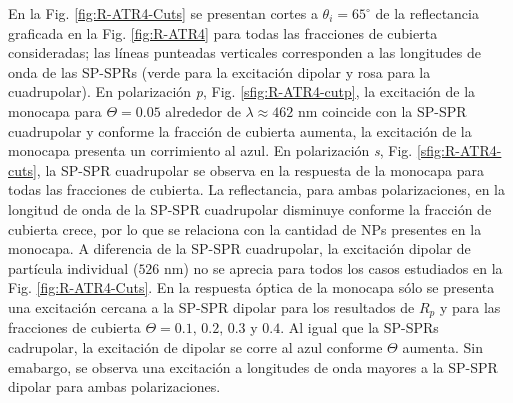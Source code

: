   En la Fig. \ref{fig:R-ATR4-Cuts} se presentan cortes a $\theta_i = 65^\circ$ de la reflectancia graficada en la Fig. \ref{fig:R-ATR4} para todas las fracciones de cubierta consideradas; las líneas punteadas verticales corresponden a las longitudes de onda de las SP-SPRs (verde para la excitación dipolar y rosa para la cuadrupolar). En polarización \emph{p}, Fig. \ref{sfig:R-ATR4-cutp}, la excitación de la monocapa para $\Theta=0.05$ alrededor de $\lambda \approx 462$ nm coincide con la SP-SPR cuadrupolar y conforme la fracción de cubierta aumenta, la excitación de la monocapa presenta un corrimiento al azul. En polarización \emph{s}, Fig. \ref{sfig:R-ATR4-cuts},  la SP-SPR cuadrupolar se observa en la respuesta de la monocapa para todas las fracciones de cubierta. La reflectancia, para ambas polarizaciones, en la longitud de onda de la SP-SPR cuadrupolar disminuye conforme la fracción de cubierta crece, por lo que se relaciona con la cantidad de NPs presentes en la monocapa. A diferencia de la SP-SPR cuadrupolar, la excitación dipolar de partícula individual ($526$ nm) no se aprecia para todos los casos estudiados en la Fig. \ref{fig:R-ATR4-Cuts}. En la respuesta óptica de la monocapa sólo se presenta una excitación cercana a la SP-SPR dipolar para los resultados de $R_p$ y para las fracciones de cubierta $\Theta = 0.1,\,0.2,\,0.3$ y $0.4$. Al igual que la SP-SPRs cadrupolar, la excitación de dipolar se corre al azul conforme $\Theta$ aumenta. Sin emabargo, se observa una excitación a longitudes de onda mayores a la SP-SPR dipolar para ambas polarizaciones.   


